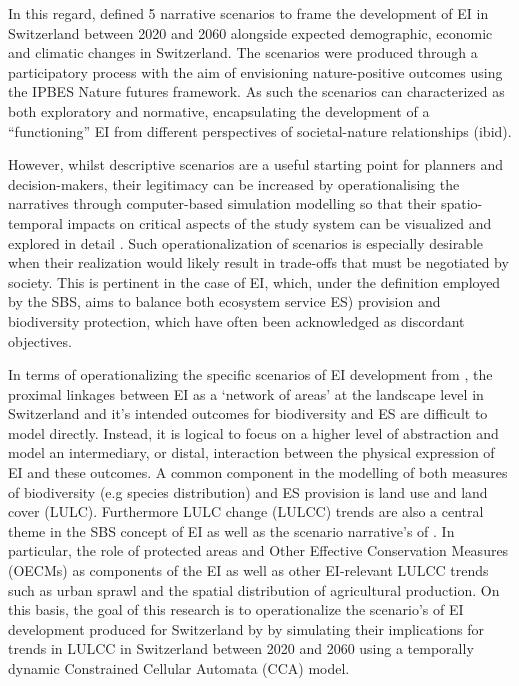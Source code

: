 \documentclass[
  authoryear,
  preprint,
  onecolumn]{elsarticle}
\begin{document}
In this regard, \citet{mayer2023} defined 5 narrative scenarios to frame
the development of EI in Switzerland between 2020 and 2060 alongside
expected demographic, economic and climatic changes in Switzerland. The
scenarios were produced through a participatory process with the aim of
envisioning nature-positive outcomes using the IPBES Nature futures
framework. As such the scenarios can characterized as both exploratory
and normative, encapsulating the development of a ``functioning'' EI
from different perspectives of societal-nature relationships (ibid).

However, whilst descriptive scenarios are a useful starting point for
planners and decision-makers, their legitimacy can be increased by
operationalising the narratives through computer-based simulation
modelling so that their spatio-temporal impacts on critical aspects of
the study system can be visualized and explored in detail
\citep{verburg2004}. Such operationalization of scenarios is especially
desirable when their realization would likely result in trade-offs that
must be negotiated by society. This is pertinent in the case of EI,
which, under the definition employed by the SBS, aims to balance both
ecosystem service ES) provision and biodiversity protection, which have
often been acknowledged as discordant objectives.

In terms of operationalizing the specific scenarios of EI development
from \citet{mayer2023}, the proximal linkages between EI as a `network
of areas' at the landscape level in Switzerland and it's intended
outcomes for biodiversity and ES are difficult to model directly.
Instead, it is logical to focus on a higher level of abstraction and
model an intermediary, or distal, interaction between the physical
expression of EI and these outcomes. A common component in the modelling
of both measures of biodiversity (e.g species distribution) and ES
provision \citep[\citet{gomes2021}]{newbold2015} is land use and land
cover (LULC). Furthermore LULC change (LULCC) trends are also a central
theme in the SBS concept of EI as well as the scenario narrative's of
\citet{mayer2023}. In particular, the role of protected areas and Other
Effective Conservation Measures (OECMs) as components of the EI as well
as other EI-relevant LULCC trends such as urban sprawl and the spatial
distribution of agricultural production. On this basis, the goal of this
research is to operationalize the scenario's of EI development produced
for Switzerland by \citet{mayer2023} by simulating their implications
for trends in LULCC in Switzerland between 2020 and 2060 using a
temporally dynamic Constrained Cellular Automata (CCA) model.
\end{document}
